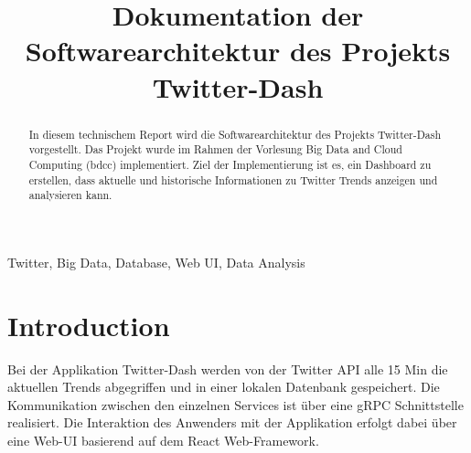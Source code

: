 \documentclass[conference]{IEEEtran}
\begin{document}
\title{Dokumentation der Softwarearchitektur des Projekts Twitter-Dash}

\author{
    \and

    \and

    \and

    \and

    \and

}

\maketitle

\begin{abstract}
    In diesem technischem Report wird die Softwarearchitektur des Projekts
    Twitter-Dash vorgestellt. Das Projekt wurde im Rahmen der Vorlesung
    Big Data and Cloud Computing (bdcc) implementiert. Ziel der Implementierung ist es,
    ein Dashboard zu erstellen, dass aktuelle und historische Informationen zu Twitter Trends
    anzeigen und analysieren kann.
\end{abstract}

\begin{IEEEkeywords}
    Twitter, Big Data, Database, Web UI, Data Analysis
\end{IEEEkeywords}

\section{Introduction}
Bei der Applikation Twitter-Dash werden von der Twitter API alle 15 Min die aktuellen Trends
abgegriffen und in einer lokalen Datenbank gespeichert. Die Kommunikation zwischen den
einzelnen Services ist über eine gRPC Schnittstelle realisiert.
Die Interaktion des Anwenders mit der Applikation erfolgt dabei über eine Web-UI basierend auf dem
React Web-Framework.
\end{document}
